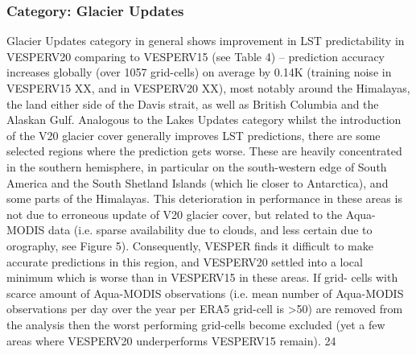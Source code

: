 \documentclass[hess, manuscript]{copernicus}
\begin{document}
\subsubsection{Category: Glacier Updates }
Glacier Updates category in general shows improvement in LST predictability in VESPERV20 comparing to VESPERV15 (see  Table  4)  –  prediction  accuracy  increases  globally  (over  1057  grid-cells)  on  average  by  0.14K  (training  noise  in VESPERV15 XX, and in VESPERV20 XX), most notably around the Himalayas, the land either side of the Davis strait, as well as British Columbia and the Alaskan Gulf. Analogous to the Lakes Updates category whilst the introduction of the V20 glacier cover generally improves LST predictions, there are some selected regions where the prediction gets worse. These are heavily  concentrated  in  the  southern  hemisphere,  in  particular  on  the  south-western  edge  of  South  America  and  the  South
Shetland Islands (which lie closer to Antarctica), and some parts of the Himalayas. This deterioration in performance in these areas is not due to erroneous update of V20 glacier cover, but related to the Aqua-MODIS data (i.e. sparse availability due to clouds, and less certain due to orography, see Figure 5). Consequently, VESPER finds it difficult to make accurate predictions in this region, and VESPERV20 settled into a local minimum which is worse than in VESPERV15 in these areas. If grid- cells with scarce amount of Aqua-MODIS observations (i.e. mean number of Aqua-MODIS observations per day over the year per ERA5 grid-cell is >50) are removed from the analysis then the worst performing grid-cells become excluded (yet a few areas where VESPERV20 underperforms VESPERV15 remain).
24
\end{document}
